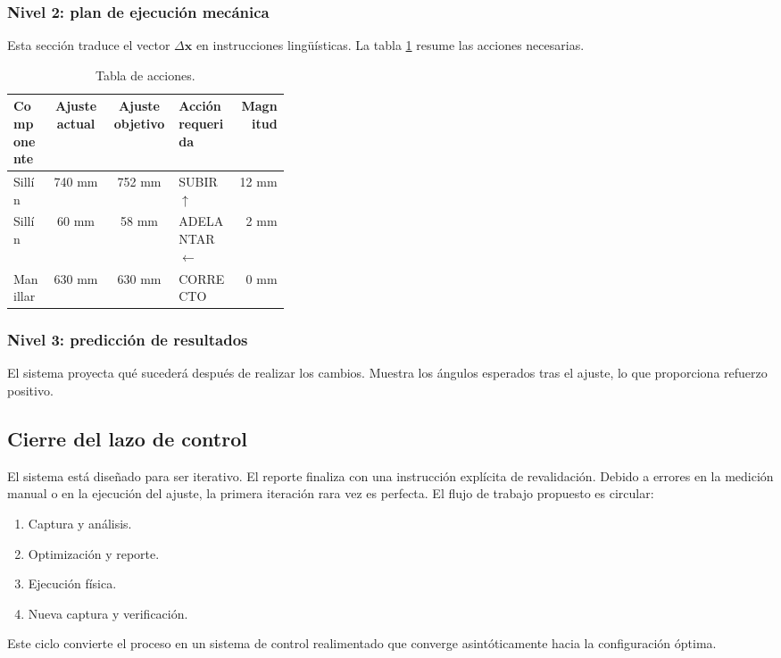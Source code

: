 \subsubsection{Nivel 2: plan de ejecución mecánica}
Esta sección traduce el vector $\Delta \mathbf{x}$ en instrucciones
lingüísticas. La tabla \ref{tab:acciones} resume las acciones necesarias.

\begin{table}[h]
  \centering
  \caption{Tabla de acciones.}
  \label{tab:acciones}
  \small
  \begin{tabular}{p{0.14\linewidth}ccp{0.22\linewidth}r}
    \toprule
    \textbf{Componente} & \textbf{Ajuste actual} & \textbf{Ajuste objetivo} & \textbf{Acción requerida} & \textbf{Magnitud} \\
    \midrule
    Sillín     & 740 mm        & 752 mm          & SUBIR $\uparrow$       & 12 mm    \\
    Sillín     & 60 mm         & 58 mm           & ADELANTAR $\leftarrow$ & 2 mm     \\
    Manillar   & 630 mm        & 630 mm          & CORRECTO               & 0 mm     \\
    \bottomrule
  \end{tabular}
\end{table}

\subsubsection{Nivel 3: predicción de resultados}
El sistema proyecta qué sucederá después de realizar los cambios. Muestra los
ángulos esperados tras el ajuste, lo que proporciona refuerzo positivo.

\subsection{Cierre del lazo de control}

El sistema está diseñado para ser iterativo. El reporte finaliza con una
instrucción explícita de revalidación. Debido a errores en la medición manual o
en la ejecución del ajuste, la primera iteración rara vez es perfecta. El flujo
de trabajo propuesto es circular:
\begin{enumerate}
  \item Captura y análisis.
  \item Optimización y reporte.
  \item Ejecución física.
  \item Nueva captura y verificación.
\end{enumerate}
Este ciclo convierte el proceso en un sistema de control realimentado que converge asintóticamente hacia la configuración óptima.